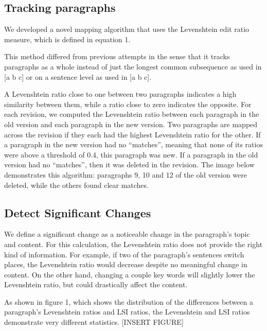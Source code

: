 \subsection{Tracking paragraphs}\label{tracking-paragraphs}

We developed a novel mapping algorithm that uses the Levenshtein edit
ratio measure, which is defined in equation 1.

This method differed from previous attempts in the sense that it tracks
paragraphs as a whole instead of just the longest common subsequence as
used in {[}a b c{]} or on a sentence level as used in {[}a b c{]}.

A Levenshtein ratio close to one between two paragraphs indicates a high
similarity between them, while a ratio close to zero indicates the
opposite. For each revision, we computed the Levenshtein ratio between
each paragraph in the old version and each paragraph in the new version.
Two paragraphs are mapped across the revision if they each had the
highest Levenshtein ratio for the other. If a paragraph in the new
version had no ``matches'', meaning that none of its ratios were above a
threshold of 0.4, this paragraph was new. If a paragraph in the old
version had no ``matches'', then it was deleted in the revision. The
image below demonstrates this algorithm: paragraphs 9, 10 and 12 of the
old version were deleted, while the others found clear matches.

\subsection{Detect Significant
Changes}\label{detect-significant-changes}

We define a significant change as a noticeable change in the paragraph's
topic and content. For this calculation, the Levenshtein ratio does not
provide the right kind of information. For example, if two of the
paragraph's sentences switch places, the Levenshtein ratio would
decrease despite no meaningful change in content. On the other hand,
changing a couple key words will slightly lower the Levenshtein ratio,
but could drastically affect the content.

As shown in figure 1, which shows the distribution of the differences
between a paragraph's Levenshtein ratios and LSI ratios, the Levenshtein
and LSI ratios demonstrate very different statistics. {[}INSERT
FIGURE{]}

